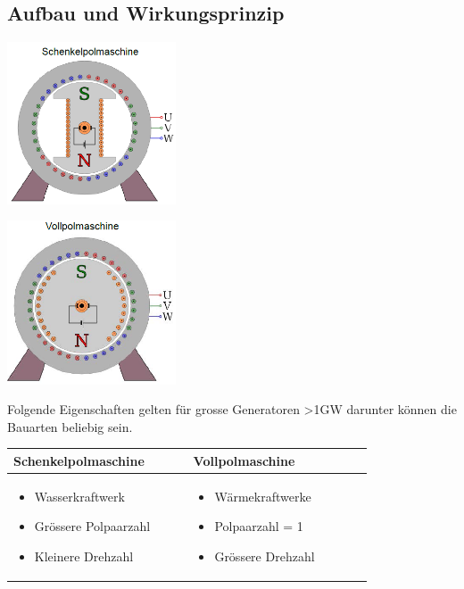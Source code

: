 \subsection{Aufbau und Wirkungsprinzip}
    \begin{minipage}[b]{0.5\linewidth}
    	\includegraphics[width = 5cm]{images/Schenkelpolmaschine}
    \end{minipage}
    \begin{minipage}[b]{0.5\linewidth}
    	\includegraphics[width = 5cm]{images/Vollpolmaschine}
    \end{minipage}
    Folgende Eigenschaften gelten für grosse Generatoren >1GW darunter können die Bauarten beliebig sein.
    \begin{tabular}[b]{| C{0.4\linewidth} | C{0.4\linewidth} |}
    	\hline
    	\textbf{Schenkelpolmaschine} &
        \textbf{Vollpolmaschine}
        \\ \hline
        
    	\vspace{-0.7cm}
    	\begin{itemize}
            \item Wasserkraftwerk
    		\item Grössere Polpaarzahl
    		\item Kleinere Drehzahl
    	\end{itemize} &
        \vspace{-0.7cm}
        \begin{itemize}
            \item Wärmekraftwerke
            \item Polpaarzahl = 1
        	\item Grössere Drehzahl
        \end{itemize}
        \\ \hline
    \end{tabular}
    \\
    \clearpage
    \pagebreak


